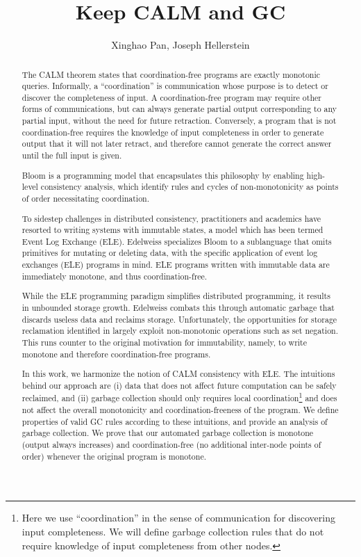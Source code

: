 \documentclass{article}
\title{Keep CALM and GC}
\author{Xinghao Pan, Joseph Hellerstein}
\numberwithin{equation}{section}
\begin{document}
\maketitle

\begin{abstract}
The CALM theorem \cite{hellerstein2010declarative, ameloot2013relational} states that coordination-free programs are exactly monotonic queries.
Informally, a ``coordination'' is communication whose purpose is to detect or discover the completeness of input.
A coordination-free program may require other forms of communications, but can always generate partial output corresponding to any partial input, without the need for future retraction.
Conversely, a program that is not coordination-free requires the knowledge of input completeness in order to generate output that it will not later retract, and therefore cannot generate the correct answer until the full input is given.

Bloom \cite{alvaro2011consistency} is a programming model that encapsulates this philosophy by enabling high-level consistency analysis, which identify rules and cycles of non-monotonicity as points of order necessitating coordination.

To sidestep challenges in distributed consistency, practitioners and academics have resorted to writing systems with immutable states, a model which has been termed Event Log Exchange (ELE).
Edelweiss \cite{conway2014edelweiss} specializes Bloom to a sublanguage that omits primitives for mutating or deleting data, with the specific application of event log exchanges (ELE) programs in mind.
ELE programs written with immutable data are immediately monotone, and thus coordination-free.

While the ELE programming paradigm simplifies distributed programming, it results in unbounded storage growth.
Edelweiss combats this through automatic garbage that discards useless data and reclaims storage.
Unfortunately, the opportunities for storage reclamation identified in \cite{conway2014edelweiss} largely exploit non-monotonic operations such as set negation.
This runs counter to the original motivation for immutability, namely, to write monotone and therefore coordination-free programs.

In this work, we harmonize the notion of CALM consistency with ELE.
The intuitions behind our approach are (i) data that does not affect future computation can be safely reclaimed, and (ii) garbage collection should only requires local coordination\footnote{
	Here we use ``coordination'' in the sense of communication for discovering input completeness.
    We will define garbage collection rules that do not require knowledge of input completeness from other nodes.
} and does not affect the overall monotonicity and coordination-freeness of the program.
We define properties of valid GC rules according to these intuitions, and provide an analysis of garbage collection.
We prove that our automated garbage collection is monotone (output always increases) and coordination-free (no additional inter-node points of order) whenever the original program is monotone.
\end{abstract}
\end{document}
